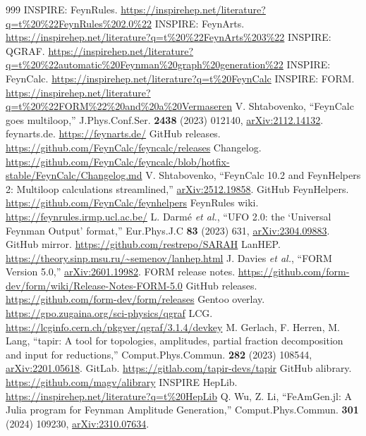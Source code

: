 \documentclass[a4paper,10pt]{ltjsarticle}
\begin{document}
\begin{thebibliography}{999}
\small
{} INSPIRE: FeynRules. \url{https://inspirehep.net/literature?q=t%20%22FeynRules%202.0%22}
 INSPIRE: FeynArts. \url{https://inspirehep.net/literature?q=t%20%22FeynArts%203%22}
 INSPIRE: QGRAF. \url{https://inspirehep.net/literature?q=t%20%22automatic%20Feynman%20graph%20generation%22}
 INSPIRE: FeynCalc. \url{https://inspirehep.net/literature?q=t%20FeynCalc}
 INSPIRE: FORM. \url{https://inspirehep.net/literature?q=t%20%22FORM%22%20and%20a%20Vermaseren}
 V. Shtabovenko, ``FeynCalc goes multiloop,'' J.Phys.Conf.Ser. \textbf{2438} (2023) 012140, \href{https://arxiv.org/abs/2112.14132}{arXiv:2112.14132}.
 feynarts.de. \url{https://feynarts.de/}
 GitHub releases. \url{https://github.com/FeynCalc/feyncalc/releases}
 Changelog. \url{https://github.com/FeynCalc/feyncalc/blob/hotfix-stable/FeynCalc/Changelog.md}
 V. Shtabovenko, ``FeynCalc 10.2 and FeynHelpers 2: Multiloop calculations streamlined,'' \href{https://arxiv.org/abs/2512.19858}{arXiv:2512.19858}.
 GitHub FeynHelpers. \url{https://github.com/FeynCalc/feynhelpers}
 FeynRules wiki. \url{https://feynrules.irmp.ucl.ac.be/}
 L. Darmé \textit{et al.}, ``UFO 2.0: the ‘Universal Feynman Output’ format,'' Eur.Phys.J.C \textbf{83} (2023) 631, \href{https://arxiv.org/abs/2304.09883}{arXiv:2304.09883}.
 GitHub mirror. \url{https://github.com/restrepo/SARAH}
 LanHEP. \url{https://theory.sinp.msu.ru/~semenov/lanhep.html}
 J. Davies \textit{et al.}, ``FORM Version 5.0,'' \href{https://arxiv.org/abs/2601.19982}{arXiv:2601.19982}.
 FORM release notes. \url{https://github.com/form-dev/form/wiki/Release-Notes-FORM-5.0}
 GitHub releases. \url{https://github.com/form-dev/form/releases}
 Gentoo overlay. \url{https://gpo.zugaina.org/sci-physics/qgraf}
 LCG. \url{https://lcginfo.cern.ch/pkgver/qgraf/3.1.4/devkey}
 M. Gerlach, F. Herren, M. Lang, ``tapir: A tool for topologies, amplitudes, partial fraction decomposition and input for reductions,'' Comput.Phys.Commun. \textbf{282} (2023) 108544, \href{https://arxiv.org/abs/2201.05618}{arXiv:2201.05618}.
 GitLab. \url{https://gitlab.com/tapir-devs/tapir}
 GitHub alibrary. \url{https://github.com/magv/alibrary}
 INSPIRE HepLib. \url{https://inspirehep.net/literature?q=t%20HepLib}
 Q. Wu, Z. Li, ``FeAmGen.jl: A Julia program for Feynman Amplitude Generation,'' Comput.Phys.Commun. \textbf{301} (2024) 109230, \href{https://arxiv.org/abs/2310.07634}{arXiv:2310.07634}.

\end{thebibliography}
\end{document}
